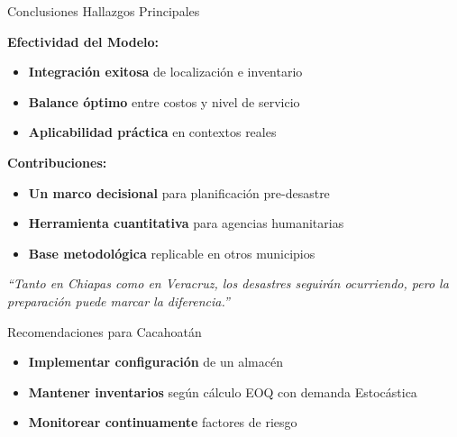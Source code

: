 \documentclass[
  ignorenonframetext,
]{beamer}
\providecommand{\tightlist}{%
  \setlength{\itemsep}{0pt}\setlength{\parskip}{0pt}}
\begin{document}
\begin{frame}{Conclusiones}
\label{conclusiones}
Hallazgos Principales

\textbf{Efectividad del Modelo:}

\begin{itemize}
\tightlist
\item
  \textbf{Integración exitosa} de localización e inventario
\item
  \textbf{Balance óptimo} entre costos y nivel de servicio
\item
  \textbf{Aplicabilidad práctica} en contextos reales
\end{itemize}

\textbf{Contribuciones:}

\begin{itemize}
\tightlist
\item
  \textbf{Un marco decisional} para planificación pre-desastre
\item
  \textbf{Herramienta cuantitativa} para agencias humanitarias
\item
  \textbf{Base metodológica} replicable en otros municipios
\end{itemize}

\vspace{1em}

\begin{block}{}
\centering
\large
\textit{
“Tanto en Chiapas como en Veracruz, los desastres seguirán ocurriendo, pero la preparación puede marcar la diferencia.”
}
\end{block}
\end{frame}

\begin{frame}{Recomendaciones para Cacahoatán}
\label{recomendaciones-para-cacahoatuxe1n}
\begin{itemize}
\tightlist
\item
  \textbf{Implementar configuración} de un almacén
\item
  \textbf{Mantener inventarios} según cálculo EOQ con demanda
  Estocástica
\item
  \textbf{Monitorear continuamente} factores de riesgo
\end{itemize}
\end{frame}
\end{document}
